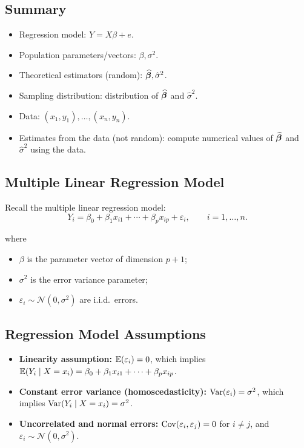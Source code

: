 \subsection{Summary}

\begin{itemize}
  \item Regression model: $Y = X\beta + e$.
  \item Population parameters/vectors: $\beta, \sigma^2$.
  \item Theoretical estimators (random): $\widehat{\boldsymbol{\beta}}, \hat{\sigma}^2$.
  \item Sampling distribution: distribution of $\widehat{\boldsymbol{\beta}}$ and $\hat{\sigma}^2$.
  \item Data: $(x_1, y_1), \ldots, (x_n, y_n)$.
  \item Estimates from the data (not random): compute numerical values of $\widehat{\boldsymbol{\beta}}$ and $\hat{\sigma}^2$ using the data.
\end{itemize}

\subsection{Multiple Linear Regression Model}

Recall the multiple linear regression model:
\[
Y_i = \beta_0 + \beta_1 x_{i1} + \cdots + \beta_p x_{ip} + \varepsilon_i,
\qquad i = 1, \ldots, n.
\]

where
\begin{itemize}
  \item $\beta$ is the parameter vector of dimension $p+1$;
  \item $\sigma^2$ is the error variance parameter;
  \item $\varepsilon_i \sim \mathcal{N}(0,\sigma^2)$ are i.i.d.\ errors.
\end{itemize}

\subsection{Regression Model Assumptions}

\begin{itemize}
  \item \textbf{Linearity assumption:} $\mathbb{E}(\varepsilon_i)=0$, which implies
  $\mathbb{E}(Y_i \mid X = x_i) = \beta_0 + \beta_1 x_{i1} + \cdots + \beta_p x_{ip}$.

  \item \textbf{Constant error variance (homoscedasticity):} $\operatorname{Var}(\varepsilon_i)=\sigma^2$, which implies
  $\operatorname{Var}(Y_i \mid X = x_i) = \sigma^2$.

  \item \textbf{Uncorrelated and normal errors:}
  $\operatorname{Cov}(\varepsilon_i,\varepsilon_j)=0$ for $i \neq j$, and
  $\varepsilon_i \sim \mathcal{N}(0,\sigma^2)$.
\end{itemize}

